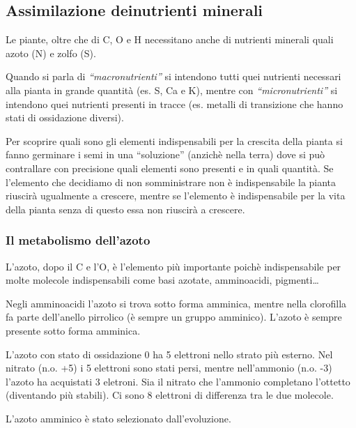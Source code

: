 \documentclass[]{article}
\begin{document}
\subsection{Assimilazione deinutrienti
minerali}\label{assimilazione-deinutrienti-minerali}

Le piante, oltre che di C, O e H necessitano anche di nutrienti minerali
quali azoto (N) e zolfo (S).

Quando si parla di \emph{``macronutrienti''} si intendono tutti quei
nutrienti necessari alla pianta in grande quantità (es. S, Ca e K),
mentre con \emph{``micronutrienti''} si intendono quei nutrienti
presenti in tracce (es. metalli di transizione che hanno stati di
ossidazione diversi).

Per scoprire quali sono gli elementi indispensabili per la crescita
della pianta si fanno germinare i semi in una ``soluzione'' (anzichè
nella terra) dove si può contrallare con precisione quali elementi sono
presenti e in quali quantità. Se l'elemento che decidiamo di non
somministrare non è indispensabile la pianta riuscirà ugualmente a
crescere, mentre se l'elemento è indispensabile per la vita della pianta
senza di questo essa non riuscirà a crescere.

\subsubsection{Il metabolismo
dell'azoto}\label{il-metabolismo-dellazoto}

L'azoto, dopo il C e l'O, è l'elemento più importante poichè
indispensabile per molte molecole indispensabili come basi azotate,
amminoacidi, pigmenti\ldots{}

Negli amminoacidi l'azoto si trova sotto forma amminica, mentre nella
clorofilla fa parte dell'anello pirrolico (è sempre un gruppo amminico).
L'azoto è sempre presente sotto forma amminica.

L'azoto con stato di ossidazione 0 ha 5 elettroni nello strato più
esterno. Nel nitrato (n.o. +5) i 5 elettroni sono stati persi, mentre
nell'ammonio (n.o. -3) l'azoto ha acquistati 3 eletroni. Sia il nitrato
che l'ammonio completano l'ottetto (diventando più stabili). Ci sono 8
elettroni di differenza tra le due molecole.

L'azoto amminico è stato selezionato dall'evoluzione.
\end{document}
